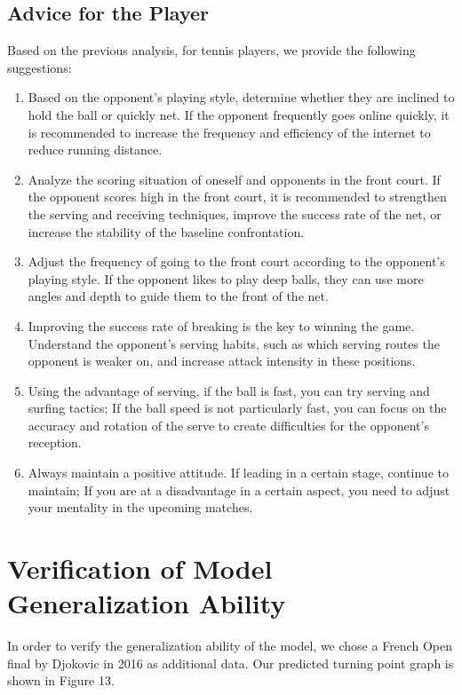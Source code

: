 \documentclass{mcmthesis}
\begin{document}
\subsection{Advice for the Player}
Based on the previous analysis, for tennis players, we provide the following suggestions:
\begin{enumerate}
  \item Based on the opponent's playing style, determine whether they are inclined to hold the ball or quickly net. If the opponent frequently goes online quickly, it is recommended to increase the frequency and efficiency of the internet to reduce running distance.
  \item Analyze the scoring situation of oneself and opponents in the front court. If the opponent scores high in the front court, it is recommended to strengthen the serving and receiving techniques, improve the success rate of the net, or increase the stability of the baseline confrontation.
  \item Adjust the frequency of going to the front court according to the opponent's playing style. If the opponent likes to play deep balls, they can use more angles and depth to guide them to the front of the net.
  \item Improving the success rate of breaking is the key to winning the game. Understand the opponent's serving habits, such as which serving routes the opponent is weaker on, and increase attack intensity in these positions.
  \item Using the advantage of serving, if the ball is fast, you can try serving and surfing tactics; If the ball speed is not particularly fast, you can focus on the accuracy and rotation of the serve to create difficulties for the opponent's reception.
  \item Always maintain a positive attitude. If leading in a certain stage, continue to maintain; If you are at a disadvantage in a certain aspect, you need to adjust your mentality in the upcoming matches.
\end{enumerate}


\section{Verification of Model Generalization Ability}
In order to verify the generalization ability of the model, we chose a French Open final by Djokovic in 2016 as additional data. Our predicted turning point graph is shown in Figure 13.
\end{document}
